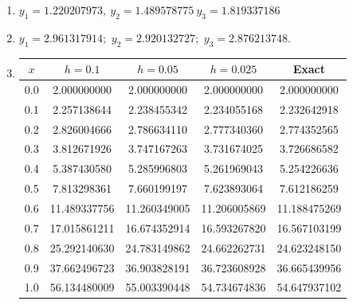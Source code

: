 \documentclass[openany]{book}
\newenvironment{sectionSolutions}{
 \begin{enumerate}[item-label={\thesection.\arabic{enumi}.}]
}{
 \end{enumerate}
}
\begin{document}
\begin{sectionSolutions}
\item
$y_1=1.220207973,\ y_2=1.489578775\ y_3=1.819337186$


\item
$y_1=2.961317914$;\ $y_2=2.920132727$;\ $y_3=2.876213748$.



\item
{\small
{}
\begin{tabular}{S[table-format=1.1] *4{S[table-format=2.9]}  }\toprule
{$x$}&{$h=0.1$}&{$h=0.05$}&{$h=0.025$}&{Exact}\\  &  2.000000000 &  2.000000000 &  2.000000000 &   2.000000000 \\
0.1 &  2.257138644 &  2.238455342 &  2.234055168 &   2.232642918 \\
0.2 &  2.826004666 &  2.786634110 &  2.777340360 &   2.774352565 \\
0.3 &  3.812671926 &  3.747167263 &  3.731674025 &   3.726686582 \\
0.4 &  5.387430580 &  5.285996803 &  5.261969043 &   5.254226636 \\
0.5 &  7.813298361 &  7.660199197 &  7.623893064 &   7.612186259 \\
0.6 & 11.489337756 & 11.260349005 & 11.206005869 &  11.188475269 \\
0.7 & 17.015861211 & 16.674352914 & 16.593267820 &  16.567103199 \\
0.8 & 25.292140630 & 24.783149862 & 24.662262731 &  24.623248150 \\
0.9 & 37.662496723 & 36.903828191 & 36.723608928 &  36.665439956 \\
1.0 & 56.134480009 & 55.003390448 & 54.734674836 &  54.647937102 \\
\bottomrule
\end{tabular}}\bigskip


\end{sectionSolutions}
\end{document}

